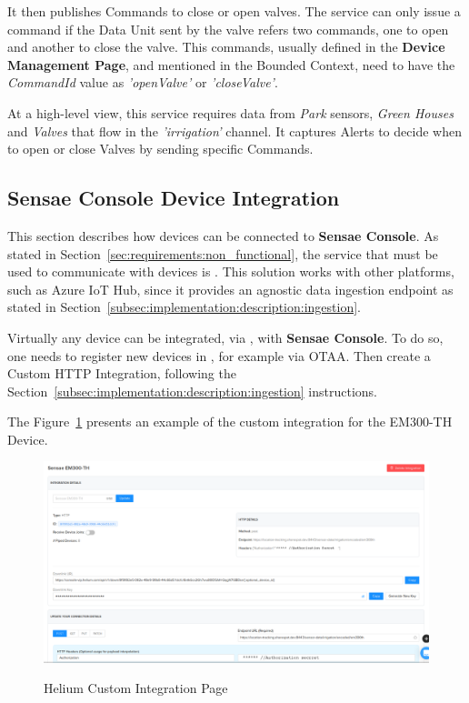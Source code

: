 It then publishes Commands to close or open valves. The service can only issue a command if the Data Unit sent by the valve refers two commands, one to open and another to close the valve. This commands, usually defined in the \textbf{Device Management Page}, and mentioned in the  Bounded Context, need to have the \textit{CommandId} value as \textit{'openValve'} or \textit{'closeValve'}.

At a high-level view, this service requires data from \textit{Park} sensors, \textit{Green Houses} and \textit{Valves} that flow in the \textit{'irrigation'} channel. It captures Alerts to decide when to open or close Valves by sending specific Commands.

\subsection{Sensae Console Device Integration}
\label{subsec:implementation:description:sensor}

This section describes how devices can be connected to \textbf{Sensae Console}. As stated in Section~\ref{sec:requirements:non_functional}, the service that must be used to communicate with devices is . This solution works with other platforms, such as Azure IoT Hub, since it provides an agnostic data ingestion endpoint as stated in Section~\ref{subsec:implementation:description:ingestion}.

Virtually any device can be integrated, via , with \textbf{Sensae Console}. To do so, one needs to register new devices in , for example via \gls{OTAA}. Then create a Custom HTTP Integration, following the Section~\ref{subsec:implementation:description:ingestion} instructions.

The Figure~\ref{fig:implementation:description:sensor:integration} presents an example of the custom integration for the EM300-TH Device.

\begin{figure}[H]
    \centering
    \resizebox{\columnwidth}{!}
    {
       \includegraphics{assets/figures/sensor/integration.png}
    }
    \caption[Helium Custom Integration Page]{Helium Custom Integration Page}
    \label{fig:implementation:description:sensor:integration}
\end{figure}

